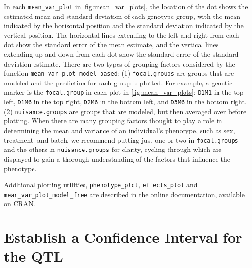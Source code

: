 \documentclass[9pt,twocolumn,twoside]{gsag3jnl}
\begin{document}
In each \texttt{mean\_var\_plot} in \autoref{fig:mean_var_plots}, the location of the dot shows the estimated mean and standard deviation of each genotype group, with the mean indicated by the horizontal position and the standard deviation indicated by the vertical position.
The horizontal lines extending to the left and right from each dot show the standard error of the mean estimate, and the vertical lines extending up and down from each dot show the standard error of the standard deviation estimate.
There are two types of grouping factors considered by the function \texttt{mean\_var\_plot\_model\_based}:
(1) \texttt{focal.groups} are groups that are modeled and the prediction for each group is plotted.
For example, a genetic marker is the \texttt{focal.group} in each plot in \autoref{fig:mean_var_plots}; \texttt{D1M1} in the top left, \texttt{D1M6} in the top right, \texttt{D2M6} in the bottom left, and \texttt{D3M6} in the bottom right.
(2) \texttt{nuisance.groups} are groups that are modeled, but then averaged over before plotting.
When there are many grouping factors thought to play a role in determining the mean and variance of an individual's phenotype, such as sex, treatment, and batch, we recommend putting just one or two in \texttt{focal.groups} and the others in \texttt{nuisance.groups} for clarity, cycling through which are displayed to gain a thorough understanding of the factors that influence the phenotype.



Additional plotting utilities, \texttt{phenotype\_plot}, \texttt{effects\_plot} and \texttt{mean\_var\_plot\_model\_free} are described in the online documentation, available on CRAN.

\section{Establish a Confidence Interval for the QTL}
\end{document}

